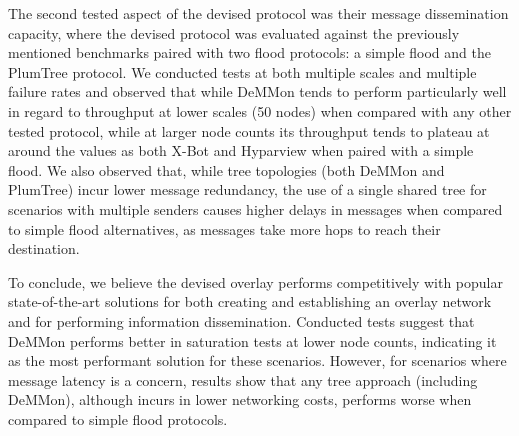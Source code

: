 The second tested aspect of the devised protocol was their message dissemination capacity, where the devised protocol was evaluated against the previously mentioned benchmarks paired with two flood protocols: a simple flood and the PlumTree protocol. We conducted tests at both multiple scales and multiple failure rates and observed that while DeMMon tends to perform particularly well in regard to throughput at lower scales (50 nodes) when compared with any other tested protocol, while at larger node counts its throughput tends to plateau at around the values as both X-Bot and Hyparview when paired with a simple flood. We also observed that, while tree topologies (both DeMMon and PlumTree) incur lower message redundancy, the use of a single shared tree for scenarios with multiple senders causes higher delays in messages when compared to simple flood alternatives, as messages take more hops to reach their destination.

To conclude, we believe the devised overlay performs competitively with popular state-of-the-art solutions for both creating and establishing an overlay network and for performing information dissemination. Conducted tests suggest that DeMMon performs better in saturation tests at lower node counts, indicating it as the most performant solution for these scenarios. However, for scenarios where message latency is a concern, results show that any tree approach (including DeMMon), although incurs in lower networking costs, performs worse when compared to simple flood protocols.



